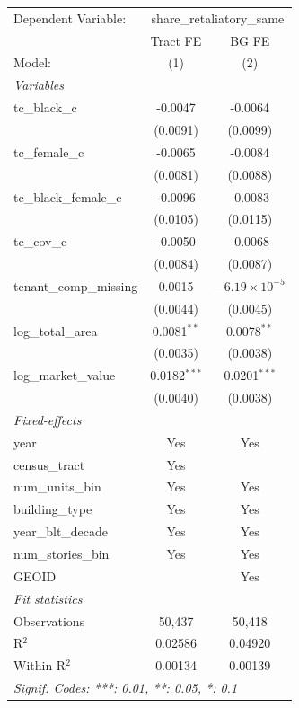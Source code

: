 \par\endgroup
\begingroup
\centering
\begin{tabular}{lcc}
   \tabularnewline \midrule \midrule
   Dependent Variable: & \multicolumn{2}{c}{share\_retaliatory\_same}\\
                           & Tract FE       & BG FE \\   
   Model:                  & (1)            & (2)\\  
   \midrule
   \emph{Variables}\\
   tc\_black\_c            & -0.0047        & -0.0064\\   
                           & (0.0091)       & (0.0099)\\   
   tc\_female\_c           & -0.0065        & -0.0084\\   
                           & (0.0081)       & (0.0088)\\   
   tc\_black\_female\_c    & -0.0096        & -0.0083\\   
                           & (0.0105)       & (0.0115)\\   
   tc\_cov\_c              & -0.0050        & -0.0068\\   
                           & (0.0084)       & (0.0087)\\   
   tenant\_comp\_missing   & 0.0015         & $-6.19\times 10^{-5}$\\    
                           & (0.0044)       & (0.0045)\\   
   log\_total\_area        & 0.0081$^{**}$  & 0.0078$^{**}$\\   
                           & (0.0035)       & (0.0038)\\   
   log\_market\_value      & 0.0182$^{***}$ & 0.0201$^{***}$\\   
                           & (0.0040)       & (0.0038)\\   
   \midrule
   \emph{Fixed-effects}\\
   year                    & Yes            & Yes\\  
   census\_tract           & Yes            & \\  
   num\_units\_bin         & Yes            & Yes\\  
   building\_type          & Yes            & Yes\\  
   year\_blt\_decade       & Yes            & Yes\\  
   num\_stories\_bin       & Yes            & Yes\\  
   GEOID                   &                & Yes\\  
   \midrule
   \emph{Fit statistics}\\
   Observations            & 50,437         & 50,418\\  
   R$^2$                   & 0.02586        & 0.04920\\  
   Within R$^2$            & 0.00134        & 0.00139\\  
   \midrule \midrule
   \multicolumn{3}{l}{\emph{Signif. Codes: ***: 0.01, **: 0.05, *: 0.1}}\\
\end{tabular}
